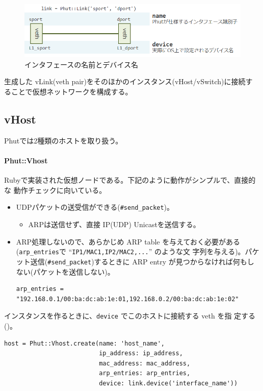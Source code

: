 \begin{figure}[h]
 \centering
 \includegraphics[scale=0.6]{img/phut-vlink-model2.png}
 \caption{インタフェースの名前とデバイス名}
 \label{fig:vlink-model2}
\end{figure}

生成した vLink(veth pair)をそのほかのインスタンス(vHost/vSwitch)に接続す
ることで仮想ネットワークを構成する。

\subsection{vHost}
Phutでは2種類のホストを取り扱う。

\paragraph{Phut::Vhost}

Rubyで実装された仮想ノードである。下記のように動作がシンプルで、直接的な
動作チェックに向いている。
\begin{itemize}
 \item UDPパケットの送受信ができる(\verb|#send_packet|)。
       \begin{itemize}
        \item ARPは送信せず、直接 IP(UDP) Unicastを送信する。
       \end{itemize}
 \item ARP処理しないので、あらかじめ ARP table を与えておく必要がある
       (\verb|arp_entries|で ``\verb|IP1/MAC1,IP2/MAC2,...|'' のような文
       字列を与える)。パケット送信(\verb|#send_packet|)するときに ARP
       entry が見つからなければ何もしない(パケットを送信しない)。
\begin{lstlisting}[title=\code{arp\_entries}の例]
arp_entries = "192.168.0.1/00:ba:dc:ab:1e:01,192.168.0.2/00:ba:dc:ab:1e:02"
\end{lstlisting}
\end{itemize}


インスタンスを作るときに、\verb|device| でこのホストに接続する veth を指
定する()。
\begin{lstlisting}[caption=Phut::Vhostインスタンスの作成,label=lst:create-vhost-instance]
host = Phut::Vhost.create(name: 'host_name',
                          ip_address: ip_address,
                          mac_address: mac_address,
                          arp_entries: arp_entries,
                          device: link.device('interface_name'))
\end{lstlisting}

